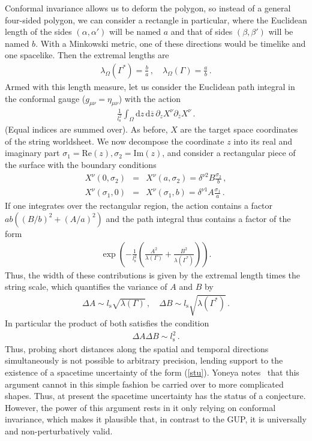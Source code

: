 \documentclass{article}
\def\beqn{\begin{eqnarray}}
\def\eeqn{\end{eqnarray}}
\begin{document}
Conformal invariance allows us to deform the polygon, so instead of a general four-sided polygon, we can  
consider a rectangle in particular, where the Euclidean length of the sides $(\alpha, \alpha')$ will be 
named $a$ and that of sides $(\beta, \beta')$ will be named $b$. With a Minkowski metric, one of
these directions would be timelike and one spacelike. Then
the extremal lengths are~\cite{Yoneya:1989ai,Yoneya:2000bt}
\beqn
\lambda_\Omega(\Gamma^*) = \frac{b}{a} \,,\quad \lambda_\Omega(\Gamma) = \frac{a}{b} \,.
\eeqn
Armed with this length measure, let us consider the Euclidean path integral in the conformal gauge ($g_{\mu \nu} = \eta_{\mu \nu}$)
with the action
\beqn
\frac{1}{l_{\mathrm{s}}^2}\int_\Omega \mathrm{d}z \,
\mathrm{d}\overline{z} \, \partial_z X^\nu \partial_{\bar z} X^\nu \,.
\eeqn
(Equal indices are summed over). As before, $X$ are the 
target space coordinates of the string worldsheet. We now decompose the coordinate $z$ into its real and imaginary part 
$\sigma_1 = \mathrm{Re}(z),\sigma_2=\mathrm{Im}(z)$, and consider a rectangular piece of the surface with the boundary conditions
\beqn
X^\nu(0,\sigma_2) &=& X^\nu(a,\sigma_2) = \delta^{\nu 2} B \frac{\sigma_2}{b} \,, \nonumber\\
X^\nu(\sigma_1, 0) &=& X^\nu(\sigma_1,b) = \delta^{\nu 1} A \frac{ \sigma_1}{a} \,. 
\eeqn
If one integrates over the rectangular region, the action contains a factor $ab( (B/b)^2 + (A/a)^2)$ and the 
path integral thus contains a factor of the form 
\beqn
\exp\left( - \frac{1}{l_{\mathrm{s}}^2} \left( \frac{A^2}{\lambda(\Gamma)} + \frac{B^2}{\lambda(\Gamma^*)}\right) \right) .
\eeqn
Thus, the width of these contributions is given by the extremal length times the string scale, which quantifies the variance of $A$ and $B$ by
\beqn
\Delta A \sim l_{\mathrm{s}} \sqrt{\lambda(\Gamma)}\,,\quad \Delta B \sim l_{\mathrm{s}} \sqrt{\lambda(\Gamma^*)}\,.
\eeqn
In particular the product of both satisfies the condition
\beqn
\Delta A \Delta B \sim l_{\mathrm{s}}^2 \,.
\eeqn
Thus, probing short distances along the spatial and temporal directions simultaneously is not possible to
arbitrary precision, lending support to the existence of a spacetime uncertainty of the form (\ref{stu}). 
Yoneya notes~\cite{Yoneya:2000bt} that this argument cannot in this simple fashion 
be carried over to more complicated shapes. Thus, at present the spacetime uncertainty has the
status of a conjecture. However, the power of this argument rests in it only relying on
conformal invariance, which makes it plausible that, in contrast to the {\sc GUP}, it is universally and non-perturbatively valid.
\end{document}
